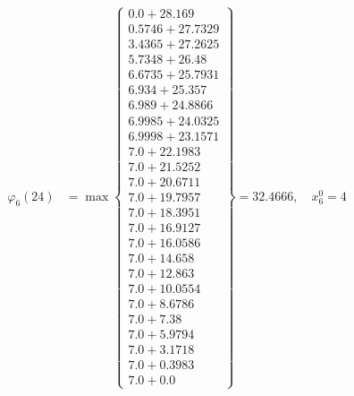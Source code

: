 \documentclass{article}
\begin{document}
\begin{align*}
  
\varphi_{6}(24) &= \max \left\{ \begin{array}{c}
0.0 + 28.169 \\
 0.5746 + 27.7329 \\
 3.4365 + 27.2625 \\
 5.7348 + 26.48 \\
 6.6735 + 25.7931 \\
 6.934 + 25.357 \\
 6.989 + 24.8866 \\
 6.9985 + 24.0325 \\
 6.9998 + 23.1571 \\
 7.0 + 22.1983 \\
 7.0 + 21.5252 \\
 7.0 + 20.6711 \\
 7.0 + 19.7957 \\
 7.0 + 18.3951 \\
 7.0 + 16.9127 \\
 7.0 + 16.0586 \\
 7.0 + 14.658 \\
 7.0 + 12.863 \\
 7.0 + 10.0554 \\
 7.0 + 8.6786 \\
 7.0 + 7.38 \\
 7.0 + 5.9794 \\
 7.0 + 3.1718 \\
 7.0 + 0.3983 \\
 7.0 + 0.0
\end{array} \right\}=32.4666,\quad x_{6}^0=4\\
  
  
  

\end{align*}
\end{document}
